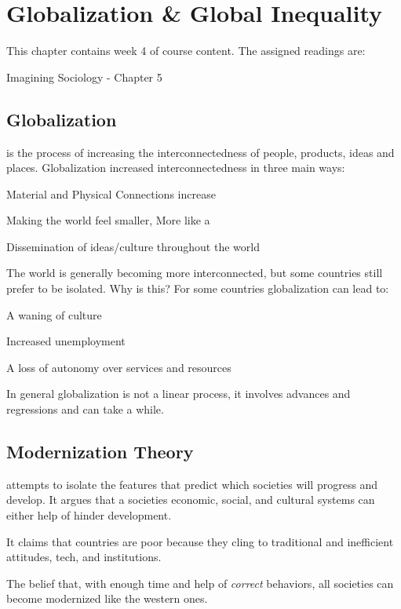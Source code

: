 \chapter{Globalization \& Global Inequality}

This chapter contains week 4 of course content. The assigned readings are:
\begin{bullets}
	\item Imagining Sociology - Chapter 5
\end{bullets}

\section{Globalization}

 is the process of increasing the interconnectedness of people, products, ideas and places. Globalization increased interconnectedness in three main ways:
\begin{bullets}
	\item Material and Physical Connections increase
	\item Making the world feel smaller, More like a 
	\item Dissemination of ideas/culture throughout the world
\end{bullets}

The world is generally becoming more interconnected, but some countries still prefer to be isolated. Why is this? For some countries globalization can lead to:
\begin{bullets}
	\item A waning of culture
	\item Increased unemployment
	\item A loss of autonomy over services and resources
\end{bullets}
In general globalization is not a linear process, it involves advances and regressions and can take a while.

\section{Modernization Theory}

 attempts to isolate the features that predict which societies will progress and develop. It argues that a societies economic, social, and cultural systems can either help of hinder development.
\begin{bullets}
	\item It claims that countries are poor because they cling to traditional and inefficient attitudes, tech, and institutions.
	\item The belief that, with enough time and help of \textit{correct} behaviors, all societies can become modernized like the western ones.
\end{bullets}

